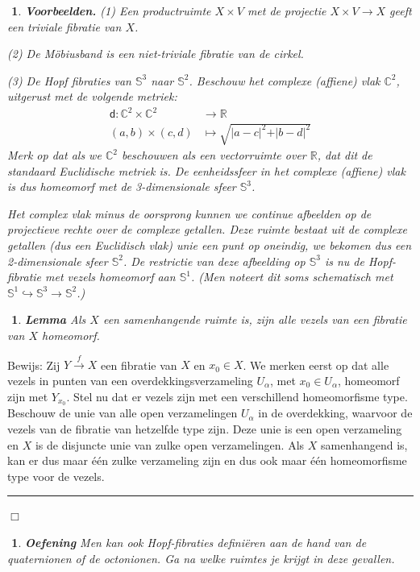 \documentclass[12pt]{book}
\newcommand{\R}{\mathbb{R}}
\newcommand{\Sf}{\mathbb{S}}
\newcommand{\dd}{\mathsf{d}}
\newcommand{\bew}{{\sc Bewijs: }}
\newcommand{\B}{\rule{1mm}{0mm} \hfill $\Box$ }
\newtheorem{eigh}[stelh]{$\!\!$}
\newenvironment{eig}{\begin{eigh}{\em {\bf Lemma }}}{\end{eigh}}
\newtheorem{vbnh}[stelh]{$\!\!$}
\newenvironment{vbn}{\begin{vbnh} \em {\bf Voorbeelden.}}{\end{vbnh}}
\newtheorem{eoef}{$\!\!$}[chapter]
\newenvironment{oef}{\begin{eoef} {\bf Oefening}}{\end{eoef}}
\begin{document}
\begin{vbn} (1) Een productruimte $X\times V$ met de projectie $X\times V \to X$ geeft een {\em triviale fibratie} van $X$. 

(2) De M\"obiusband is een niet-triviale fibratie van de cirkel.

(3) De Hopf fibraties van $\mathbb{S}^3$ naar $\mathbb{S}^2$. Beschouw het complexe (affiene) vlak $\mathbb{C}^2$, uitgerust met de volgende metriek:
\begin{align*}
\dd : \mathbb{C}^2 \times \mathbb{C}^2 &\to \R \\
(a,b) \times (c,d)  &\mapsto \sqrt{\vert a - c \vert^2 + \vert b- d \vert^2}
\end{align*}
Merk op dat als we $\mathbb{C}^2$ beschouwen als een vectorruimte over $\R$, dat dit de standaard Euclidische metriek is. De eenheidssfeer in het complexe (affiene) vlak is dus homeomorf met de 3-dimensionale sfeer $\mathbb{S}^3$.

Het complex vlak minus de oorsprong kunnen we continue afbeelden op de projectieve rechte over de complexe getallen. Deze ruimte bestaat uit de complexe getallen (dus een Euclidisch vlak) unie een punt op oneindig, we bekomen dus een 2-dimensionale sfeer $\mathbb{S}^2$. De restrictie van deze afbeelding op $\mathbb{S}^3$ is nu de \emph{Hopf-fibratie} met vezels homeomorf aan $\mathbb{S}^1$. (Men noteert dit soms schematisch met $\Sf^1 \hookrightarrow \Sf^3 \to \Sf^2$.)
\end{vbn}

\begin{eig} Als $X$ een samenhangende ruimte is,  zijn alle vezels van een fibratie van $X$ homeomorf.
\end{eig}
\bew Zij $Y\stackrel{f}{\to} X$ een fibratie van $X$ en $x_0\in X$. We merken eerst op dat alle vezels in punten van een overdekkingsverzameling $U_\alpha$, met $x_0\in U_\alpha$, homeomorf zijn met $Y_{x_{0}}$. Stel nu dat er vezels zijn met een verschillend homeomorfisme type. Beschouw de unie van alle open verzamelingen $U_\alpha$ in de overdekking, waarvoor de vezels van de fibratie van hetzelfde type zijn. Deze unie is een open verzameling en $X$ is de disjuncte unie van zulke open verzamelingen. Als $X$ samenhangend is, kan er dus maar \'e\'en zulke verzameling zijn en dus ook maar \'e\'en homeomorfisme type voor de vezels. \B


\begin{oef}
Men kan ook Hopf-fibraties defini\"eren aan de hand van de quaternionen of de octonionen. Ga na welke ruimtes je krijgt in deze gevallen.
\end{oef}
\end{document}
